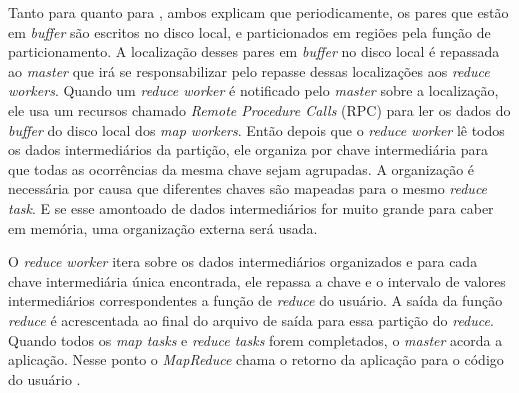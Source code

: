                 Tanto para  quanto para , ambos explicam que periodicamente,
                os pares que estão em \textit{buffer} são escritos no disco local, e particionados em regiões pela função de
                particionamento. A localização desses pares em \textit{buffer} no disco local é repassada ao \textit{master}
                que irá se responsabilizar pelo repasse dessas localizações aos \textit{reduce workers}. Quando um \textit{reduce
                worker} é notificado pelo \textit{master} sobre a localização, ele usa um recursos chamado \textit{Remote
                Procedure Calls} (RPC) para ler os dados do \textit{buffer} do disco local dos \textit{map workers}. Então
                depois que o \textit{reduce worker} lê todos os dados intermediários da partição, ele organiza por chave
                intermediária para que todas as ocorrências da mesma chave sejam agrupadas. A organização é necessária
                por causa que diferentes chaves são mapeadas para o mesmo \textit{reduce task}. E se esse amontoado de
                dados intermediários for muito grande para caber em memória, uma organização externa será usada.

                O \textit{reduce worker} itera sobre os dados intermediários organizados e para cada chave intermediária
                única encontrada, ele repassa a chave e o intervalo de valores intermediários correspondentes a função de
                \textit{reduce} do usuário. A saída da função \textit{reduce} é acrescentada ao final do arquivo de saída
                para essa partição do \textit{reduce}. Quando todos os \textit{map tasks} e \textit{reduce tasks} forem
                completados, o \textit{master} acorda a aplicação. Nesse ponto o \textit{MapReduce} chama o retorno da
                aplicação para o código do usuário \cite{dean2008}.

